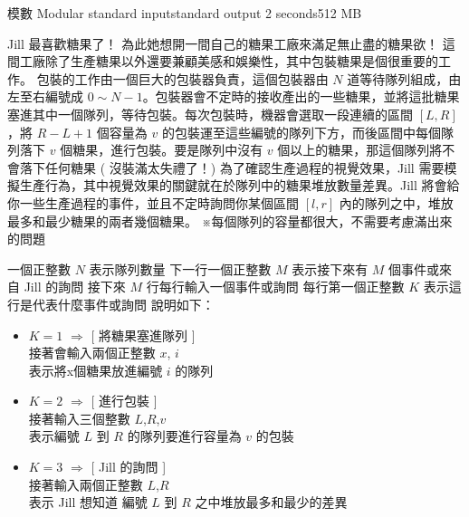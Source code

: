 \gdef\thisproblemauthor{}
\gdef\thisproblemdeveloper{}
\gdef\thisproblemorigin{}
\begin{problem}{模數 Modular}
{standard input}{standard output}
{2 seconds}{512 MB}{}

Jill 最喜歡糖果了！\newline
為此她想開一間自己的糖果工廠來滿足無止盡的糖果欲！\newline
\newline
這間工廠除了生產糖果以外還要兼顧美感和娛樂性，其中包裝糖果是個很重要的工作。\newline
包裝的工作由一個巨大的包裝器負責，這個包裝器由 $N$ 道等待隊列組成，由左至右編號成 $0 \sim N-1$。包裝器會不定時的接收產出的一些糖果，並將這批糖果塞進其中一個隊列，等待包裝。每次包裝時，機器會選取一段連續的區間 $[ L , R ]$，將 $R-L+1$ 個容量為 $v$ 的包裝運至這些編號的隊列下方，而後區間中每個隊列落下 $v$ 個糖果，進行包裝。要是隊列中沒有 $v$ 個以上的糖果，那這個隊列將不會落下任何糖果 ( 沒裝滿太失禮了！)\newline
\newline
為了確認生產過程的視覺效果，Jill 需要模擬生產行為，其中視覺效果的關鍵就在於隊列中的糖果堆放數量差異。Jill 將會給你一些生產過程的事件，並且不定時詢問你某個區間 $[l,r]$ 內的隊列之中，堆放最多和最少糖果的兩者幾個糖果。\newline
\newline
※每個隊列的容量都很大，不需要考慮滿出來的問題\newline


\InputFile

一個正整數 $N$ 表示隊列數量 \newline
下一行一個正整數 $M$ 表示接下來有 $M$ 個事件或來自 Jill 的詢問 \newline
接下來 $M$ 行每行輸入一個事件或詢問 \newline
每行第一個正整數 $K$ 表示這行是代表什麼事件或詢問 \newline \newline
說明如下：
\begin{itemize}
\item $K=1$ $\Rightarrow$ [ 將糖果塞進隊列 ] \\
            接著會輸入兩個正整數 $x$, $i$ \\
            表示將x個糖果放進編號 $i$ 的隊列
\item $K=2$ $\Rightarrow$ [ 進行包裝 ] \\
            接著輸入三個整數 $L$,$R$,$v$ \\
            表示編號 $L$ 到 $R$ 的隊列要進行容量為 $v$ 的包裝
\item $K=3$ $\Rightarrow$ [ Jill 的詢問 ] \\
            接著輸入兩個正整數 $L$,$R$ \\
            表示 Jill 想知道 編號 $L$ 到 $R$ 之中堆放最多和最少的差異
\end{itemize}


\end{problem}
